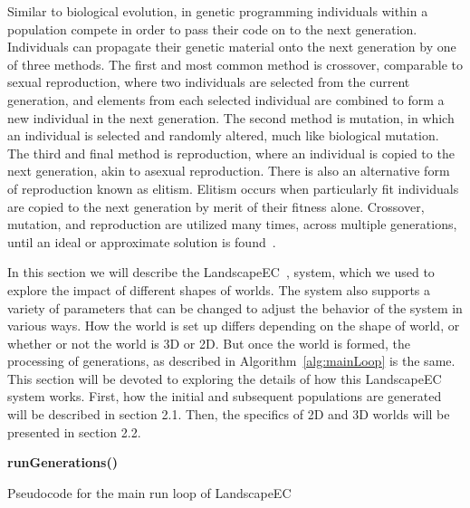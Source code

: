 \documentclass[12pt]{article}
\begin{document}
Similar to biological evolution, in genetic programming individuals within a population compete in order to pass their code on to the next generation. Individuals can propagate their genetic material onto the next generation by one of three methods. The first and most common method is crossover, comparable to sexual reproduction, where two individuals are selected from the current generation, and elements from each selected individual are combined to form a new individual in the next generation. The second method is mutation, in which an individual is selected and randomly altered, much like biological mutation. The third and final method is reproduction, where an individual is copied to the next generation, akin to asexual reproduction. There is also an alternative form of reproduction known as elitism. Elitism occurs when particularly fit individuals are copied to the next generation by merit of their fitness alone. Crossover, mutation, and reproduction are utilized many times, across multiple generations, until an ideal or approximate solution is found~\cite{poli08:fieldguide}.



In this section we will describe the LandscapeEC~\cite{korth:2007,ellgren:2011},  system, which we used to explore the impact of different shapes of worlds. The system also supports a variety of parameters that can be changed to adjust the behavior of the system in various ways. How the world is set up differs depending on the shape of world, or whether or not the world is 3D or 2D. But once the world is formed, the processing of generations, as described in Algorithm~\ref{alg:mainLoop} is the same. This section will be devoted to exploring the details of how this LandscapeEC system works. First, how the initial and subsequent populations are generated will be described in section 2.1. Then, the specifics of 2D and 3D worlds will be presented in section 2.2.

\begin{algorithm}[tb]
{\bf runGenerations()}
\caption{Pseudocode for the main run loop of LandscapeEC}
\label{alg:mainLoop}
\end{algorithm}
\end{document}
